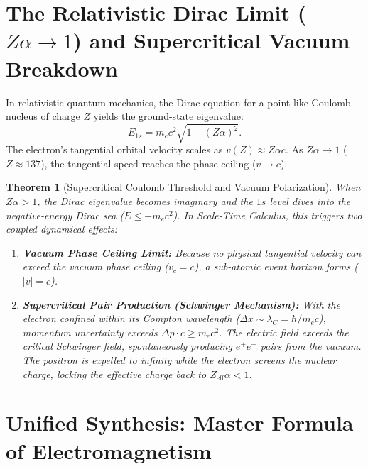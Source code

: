 \documentclass[11pt,a4paper]{article}
\newtheorem{theorem}{Theorem}[section]
\begin{document}
\section{The Relativistic Dirac Limit (\texorpdfstring{$Z \alpha \to 1$}{Z alpha -> 1}) and Supercritical Vacuum Breakdown}
\label{sec:feynmanium}

In relativistic quantum mechanics, the Dirac equation for a point-like Coulomb nucleus of charge $Z$ yields the ground-state eigenvalue:
\begin{equation}
    E_{1s} = m_e c^2 \sqrt{1 - (Z\alpha)^2}.
    \label{eq:dirac_energy_en}
\end{equation}
The electron's tangential orbital velocity scales as $v(Z) \approx Z \alpha c$. As $Z\alpha \to 1$ ($Z \approx 137$), the tangential speed reaches the phase ceiling ($v \to c$).

\begin{theorem}[Supercritical Coulomb Threshold and Vacuum Polarization]
    \label{thm:alt_atomik_olay_ufku_p2}
    When $Z\alpha > 1$, the Dirac eigenvalue becomes imaginary and the $1s$ level dives into the negative-energy Dirac sea ($E \le -m_e c^2$). In Scale-Time Calculus, this triggers two coupled dynamical effects:
    \begin{enumerate}
        \item \textbf{Vacuum Phase Ceiling Limit:} Because no physical tangential velocity can exceed the vacuum phase ceiling ($v_c = c$), a sub-atomic event horizon forms ($|v| = c$).
        \item \textbf{Supercritical Pair Production (Schwinger Mechanism):} With the electron confined within its Compton wavelength ($\Delta x \sim \lambda_C = \hbar / m_e c$), momentum uncertainty exceeds $\Delta p \cdot c \ge m_e c^2$. The electric field exceeds the critical Schwinger field, spontaneously producing $e^+ e^-$ pairs from the vacuum. The positron is expelled to infinity while the electron screens the nuclear charge, locking the effective charge back to $Z_{\mathrm{eff}} \alpha < 1$.
    \end{enumerate}
\end{theorem}

\section{Unified Synthesis: Master Formula of Electromagnetism}
\label{sec:ana_formul_em}
\end{document}

